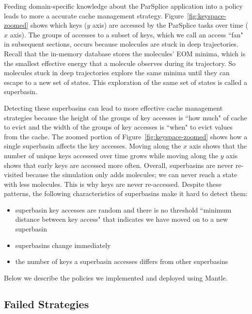 Feeding domain-specific knowledge about the ParSplice application into a policy
leads to more a accurate cache management strategy.
Figure~\ref{fig:keyspace-zoomed} shows which keys (\(y\) axis) are accessed by
the ParSplice tasks over time (\(x\) axis). The groups of accesses to a subset
of keys, which we call an access ``fan" in subsequent sections, occurs because
molecules are stuck in deep trajectories. Recall that the in-memory database
stores the molecules' EOM minima, which is the smallest effective energy that a
molecule observes during its trajectory. So molecules stuck in deep
trajectories explore the same minima until they can escape to a new set of
states. This exploration of the same set of states is called a superbasin. 

Detecting these superbasins can lead to more effective cache management
strategies because the height of the groups of key accesses is ``how much" of cache
to evict and the width of the groups of key accesses is ``when" to evict values from
the cache.  The zoomed portion of Figure~\ref{fig:keyspace-zoomed} shows how a
single superbasin affects the key accesses. Moving along the \(x\) axis shows
that the number of unique keys accessed over time grows while moving along the
\(y\) axis shows that early keys are accessed more often.  Overall, superbasins
are never re-visited because the simulation only adds molecules; we can never
reach a state with less molecules. This is why keys are never re-accessed.
Despite these patterns, the following characteristics of superbasins make it
hard to detect them:

\begin{itemize}

  \item superbasin key accesses are random and there is no threshold ``minimum distance
  between key access" that indicates we have moved on to a new superbasin

  \item superbasins change immediately

  \item the number of keys a superbasin accesses differs from other superbasins

\end{itemize}

Below we describe the policies we implemented and deployed using Mantle.

\subsection{Failed Strategies}


